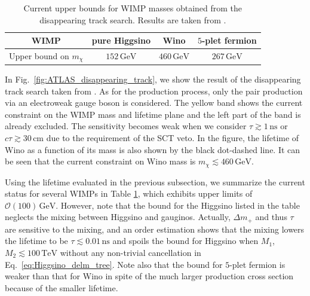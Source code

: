 \documentclass[12pt,twoside,book]{article}
\begin{document}
\begin{table}[t]
  \centering
  \begin{tabular}{c|ccc}
    WIMP & pure Higgsino & Wino & $5$-plet fermion \\ \hline
    Upper bound on $m_\chi$ & $152\, \mathrm{GeV}$ & $460\, \mathrm{GeV}$
    & $267\, \mathrm{GeV}$
  \end{tabular}
  \caption{
    Current upper bounds for WIMP masses obtained from the disappearing track search.
    Results are taken from \cite{ATL-PHYS-PUB-2017-019, Aaboud:2017mpt, Sirunyan:2018ldc, Ostdiek:2015aga}.
  }
  \label{tab:disp_track_current}
\end{table}

In Fig.~\ref{fig:ATLAS_disappearing_track}, we show the result of the disappearing track search taken from \cite{Aaboud:2017mpt}.
As for the production process, only the pair production via an electroweak gauge boson is considered.
The yellow band shows the current constraint on the WIMP mass and lifetime plane and the left part of the band is already excluded.
The sensitivity becomes weak when we consider $\tau \gtrsim 1\, \mathrm{ns}$ or $c \tau \gtrsim 30\, \mathrm{cm}$ due to the requirement of the SCT veto.
In the figure, the lifetime of Wino as a function of its mass is also shown by the black dot-dashed line.
It can be seen that the current constraint on Wino mass is $m_\chi \lesssim 460\,\mathrm{GeV}$.

Using the lifetime evaluated in the previous subsection, we summarize the current status for several WIMPs in Table \ref{tab:disp_track_current}, which exhibits upper limits of $\mathcal{O} (100)\,\mathrm{GeV}$.
However, note that the bound for the Higgsino listed in the table neglects the mixing between Higgsino and gauginos.
Actually, $\Delta m_{+}$ and thus $\tau$ are sensitive to the mixing, and an order estimation shows that the mixing lowers the lifetime to be $\tau \lesssim 0.01\,\mathrm{ns}$ and spoils the bound for Higgsino when $M_1$, $M_2 \lesssim 100\,\mathrm{TeV}$ without any non-trivial cancellation in Eq.~\eqref{eq:Higgsino_delm_tree}.
Note also that the bound for $5$-plet fermion is weaker than that for Wino in spite of the much larger production cross section because of the smaller lifetime.
\end{document}
